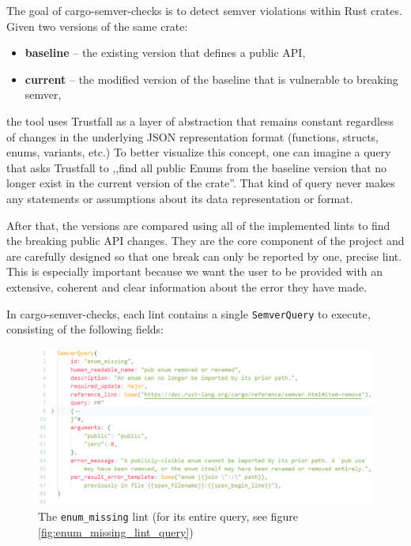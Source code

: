 \documentclass[licencjacka,en]{pracamgr}
\begin{document}
The goal of cargo-semver-checks is to detect semver violations within Rust crates. Given two versions
of the same crate:
\begin{itemize}
	\item \textbf{baseline} -- the existing version that defines a public API,
	\item \textbf{current} -- the modified version of the baseline that is vulnerable to breaking semver,
\end{itemize}
the tool uses Trustfall as a layer of abstraction that remains constant regardless of changes in the underlying JSON representation format
(functions, structs, enums, variants, etc.) To better visualize this concept, one can imagine a query
that asks Trustfall to ,,find all public Enums from the baseline version that no longer exist in the
current version of the crate''. That kind of query never makes any statements or assumptions about its data
representation or format.

After that, the versions are compared using all of
the implemented lints to find the breaking public API changes. They are the core component of
the project and are carefully designed so that one break can only be reported by one, precise
lint. This is especially important because we want the user to be provided with an extensive, coherent
and clear information about the error they have made.

In cargo-semver-checks, each lint contains a single \texttt{SemverQuery} to execute, consisting of
the following fields:

\begin{figure}[h]
	\centering
	\includegraphics[width=\linewidth]{lint-example.png}
	\caption{The \texttt{enum\_missing} lint (for its entire query, see figure
		\ref{fig:enum_missing_lint_query})}
	\label{fig:enum_missing_lint}
\end{figure}
\end{document}
